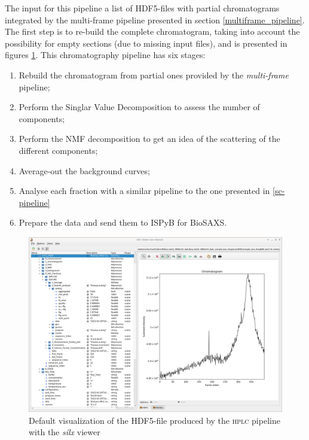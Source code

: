 \documentclass[preprint]{iucr}              %
\begin{document}
The input for this pipeline a list of HDF5-files with partial chromatograms integrated by the multi-frame pipeline presented in section \ref{multiframe_pipeline}.
The first step is to re-build the complete chromatogram, taking into account the possibility for empty sections (due to missing input files), and is presented in figures \ref{hplc}.
This chromatography pipeline has six stages:
\begin{enumerate}
    \item Rebuild the chromatogram from partial ones provided by the \textit{multi-frame} pipeline;
    \item Perform the Singlar Value Decomposition to assess the number of components;
    \item Perform the NMF decomposition to get an idea of the scattering of the different components;
    \item Average-out the background curves;
    \item Analyse each fraction with a similar pipeline to the one presented in \ref{sc-pipeline}
    \item Prepare the data and send them to ISPyB for BioSAXS.
\end{enumerate}

\begin{figure}
\label{hplc}
\begin{center}
\includegraphics[width=12cm]{hplc}
\caption{Default visualization of the HDF5-file produced by the \textsc{hplc} pipeline with the \textit{silx} viewer}
\end{center}
\end{figure}
\end{document}
